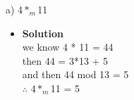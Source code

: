 \documentclass[11pt]{article}
\begin{document}


\begin{enumerate}

\begin{flushleft}
{\large a) 4$*_m$11}\\
\end{flushleft}





\begin{itemize}

\item \textbf{Solution}\\
\large we know 4 * 11 = 44\\
\large then 44 = 3*13 + 5\\
\large and then 44 mod 13 = 5\\
\large $\therefore$ 4$*_m$11 = 5\\



\end {itemize}
\end {enumerate}
\end{document}
